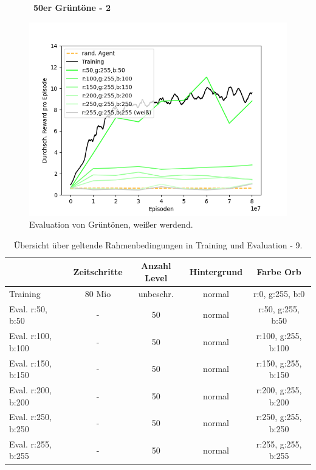 \begin{figure}[htp!]
   \centering
   \captionsetup{width=0.45\linewidth} 
    \begin{minipage}{0.48\linewidth}
        \centering\
        \textbf{50er Grüntöne - 2}\par\medskip
        \includegraphics[scale=0.5]{abb/_graphen/floor_80mio_inflvl_Training_eval50Others}
        \caption{Evaluation von Grüntönen, weißer werdend.}
        \label{fig:floor_80Mio_inflvl_15act_Training_eval50Others}
    \end{minipage}
\end{figure}
\begin{center}
 \begin{table}[htp!]
 \begin{center}
  \begin{tabular}{ l c c c c }
    \hline
		               			& Zeitschritte & Anzahl Level & 		Hintergrund & Farbe Orb \\ \hline \hline
     Training              			& 80 Mio       & unbeschr.	  & 	    		normal & r:0, g:255, b:0 \\ \hline
     Eval. r:50, b:50	 	& -	        	   & 50		  	  &			normal & r:50, g:255, b:50 \\ \hline
     Eval. r:100, b:100	& -	        	   & 50		  & 	    				normal & r:100, g:255, b:100  \\ \hline
     Eval. r:150, b:150 	& -	        	   & 50		  & 	    			normal & r:150, g:255, b:150  \\ \hline
     Eval. r:200, b:200 	& -	        	   & 50		  & 	    			normal & r:200, g:255, b:200 \\ \hline
     Eval. r:250, b:250 	& -	        	   & 50		  & 	    			normal & r:250, g:255, b:250 \\ \hline
     Eval. r:255, b:255 	& -	        	   & 50		  & 	    			normal & r:255, g:255, b:255 \\ \hline
    \hline   
  \end{tabular}
  \caption{Übersicht über geltende Rahmenbedingungen in Training und Evaluation - 9.}
  \label{tab:tab_durch_EXP_trainSetting9}
  \end{center}
 \end{table}
\end{center} 

